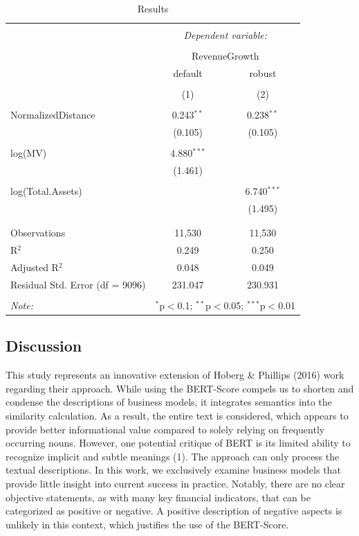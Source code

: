 \documentclass[
]{article}
\begin{document}
\begin{table}[!htbp] \centering 
  \caption{Results} 
  \label{} 
\begin{tabular}{@{\extracolsep{5pt}}lcc} 
\\[-1.8ex]\hline 
\hline \\[-1.8ex] 
 & \multicolumn{2}{c}{\textit{Dependent variable:}} \\ 
\cline{2-3} 
\\[-1.8ex] & \multicolumn{2}{c}{RevenueGrowth} \\ 
 & default & robust \\ 
\\[-1.8ex] & (1) & (2)\\ 
\hline \\[-1.8ex] 
 NormalizedDistance & 0.243$^{**}$ & 0.238$^{**}$ \\ 
  & (0.105) & (0.105) \\ 
  & & \\ 
 log(MV) & 4.880$^{***}$ &  \\ 
  & (1.461) &  \\ 
  & & \\ 
 log(Total.Assets) &  & 6.740$^{***}$ \\ 
  &  & (1.495) \\ 
  & & \\ 
\hline \\[-1.8ex] 
Observations & 11,530 & 11,530 \\ 
R$^{2}$ & 0.249 & 0.250 \\ 
Adjusted R$^{2}$ & 0.048 & 0.049 \\ 
Residual Std. Error (df = 9096) & 231.047 & 230.931 \\ 
\hline 
\hline \\[-1.8ex] 
\textit{Note:}  & \multicolumn{2}{r}{$^{*}$p$<$0.1; $^{**}$p$<$0.05; $^{***}$p$<$0.01} \\ 
\end{tabular} 
\end{table}

\newpage{}

\subsection{Discussion}\label{discussion}

This study represents an innovative extension of Hoberg \& Phillips
(2016) work regarding their approach. While using the BERT-Score compels
us to shorten and condense the descriptions of business models, it
integrates semantics into the similarity calculation. As a result, the
entire text is considered, which appears to provide better informational
value compared to solely relying on frequently occurring nouns. However,
one potential critique of BERT is its limited ability to recognize
implicit and subtle meanings (1). The approach can only process the
textual descriptions. In this work, we exclusively examine business
models that provide little insight into current success in practice.
Notably, there are no clear objective statements, as with many key
financial indicators, that can be categorized as positive or negative. A
positive description of negative aspects is unlikely in this context,
which justifies the use of the BERT-Score.
\end{document}
